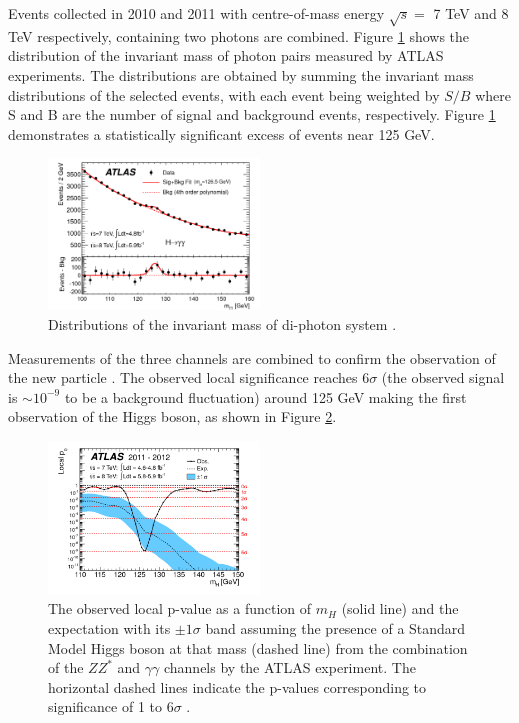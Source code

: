 Events collected in 2010 and 2011 with centre-of-mass energy $\sqrt{s}=$ 7 TeV and 8 TeV respectively, containing two photons are combined. Figure \ref{fig:chap1:H2012:Hyy} shows the distribution of the invariant mass of photon pairs measured by ATLAS experiments. The distributions are obtained by summing the invariant mass distributions of the selected events, with each event being weighted by $S/B$ where S and B are the number of signal and background events, respectively. Figure \ref{fig:chap1:H2012:Hyy} demonstrates a statistically significant excess of events near 125 GeV.
\begin{figure}[htbp]
    \centering
    \includegraphics[width=0.5\textwidth]{Ch1/Img/Hmyy.png}
    \caption{Distributions of the invariant mass of di-photon system \cite{ATLAS_2012}.}
    \label{fig:chap1:H2012:Hyy}
\end{figure}
Measurements of the three channels are combined to confirm the observation of the new particle \cite{ATLAS_2012}. The observed local significance reaches $6\sigma$ (the observed signal is $\sim10^{-9}$ to be a background fluctuation) around 125 GeV making the first observation of the Higgs boson, as shown in Figure \ref{fig:chap1:H2012:P0}. \\
\begin{figure}[htbp]
    \centering
    \includegraphics[width=0.5\textwidth]{Ch1/Img/Hp0.png}
    \caption{The observed local p-value as a function of $m_H$ (solid line) and the expectation with its $\pm1\sigma$ band assuming the presence of a Standard Model Higgs boson at that mass (dashed line) from the combination of the $ZZ^*$ and  $\gamma\gamma$ channels by the ATLAS experiment. The horizontal dashed lines indicate the p-values corresponding to significance of 1 to 6$\sigma$ \cite{ATLAS_2012}.}
    \label{fig:chap1:H2012:P0}
\end{figure}
